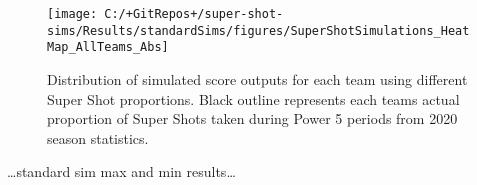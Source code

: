 \documentclass[]{elsarticle} %
\begin{document}
\begin{landscape}
\begin{figure}

{\centering \texttt{[image: C:/+GitRepos+/super-shot-sims/Results/standardSims/figures/SuperShotSimulations\_HeatMap\_AllTeams\_Abs]} 

}

\caption{Distribution of simulated score outputs for each team using different Super Shot proportions. Black outline represents each teams actual proportion of Super Shots taken during Power 5 periods from 2020 season statistics.}\label{fig:heatMapFig}
\end{figure}
\end{landscape}

\ldots standard sim max and min results\ldots{}
\end{document}
